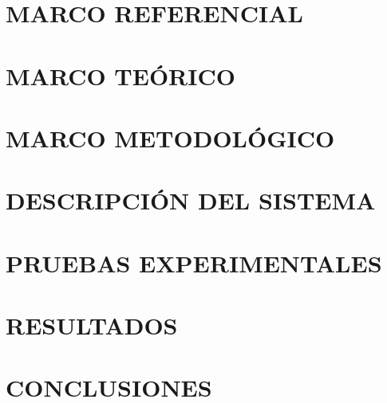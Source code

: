\documentclass[letterpaper,titlepage,12pt,oneside,spanish,final]{report_eie}
\begin{document}
%
%

\chapter{MARCO REFERENCIAL}\label{CAP:referencial}
%

\chapter{MARCO TEÓRICO}\label{CAP:marco_teor}
%

\chapter{MARCO METODOLÓGICO}\label{CAP:marco_met}

\chapter{DESCRIPCIÓN DEL SISTEMA}\label{CAP:mod}
%

\chapter{PRUEBAS EXPERIMENTALES}\label{CAP:exp}
%

\chapter{RESULTADOS}\label{CAP:resultados}
%

\chapter{CONCLUSIONES}\label{CAP:conclu}
%
\end{document}
